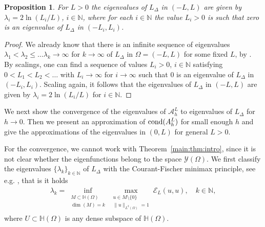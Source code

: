 \documentclass[10 pt]{article}
\newtheorem{proposition}[theorem]{Proposition}
\numberwithin{equation}{section}
\def\N{\mathbb{N}}
\def\mH{\mathbb{H}}
\begin{document}
\begin{proposition}\label{eigenvalue approximation a}
For $L>0$ the eigenvalues of $L_{\Delta}$ in $(-L,L)$ are given by $\lambda_i=2\ln(L_i/L)$, $i\in \N$, where for each $i\in \N$ the value $L_i>0$ is such that zero is an eigenvalue of $L_{\Delta}$ in $(-L_i,L_i)$.
\end{proposition}
\begin{proof}
We already know that there is an infinite sequence of eigenvalues $\lambda_1<\lambda_2\leq\ldots\lambda_k\to \infty$ for $k\to\infty$ of $L_{\Delta}$ in $\Omega=(-L,L)$ for some fixed $L$, by \cite[Theorem 1.4]{CW19}. By scalings, one can find a sequence of values $L_i>0$, $i\in \N$ satisfying $0<L_1<L_2<\ldots$ with $L_i\to\infty$ for $i\to \infty$ such that $0$ is an eigenvalue of $L_{\Delta}$ in $(-L_i,L_i)$. Scaling again, it follows that the eigenvalues of $L_{\Delta}$ in $(-L,L)$ are given by $\lambda_i=2\ln(L_i/L)$ for $i\in \N$.
%
\end{proof}

We next show the convergence of the eigenvalues of $\mathcal{A}^L_h$ to eigenvalues of $L_{\Delta}$ for $h\to 0$. Then we present an approximation of $\textnormal{cond}(A^L_h)$ for small enough $h$ and give the approximations of the eigenvalues in $(0,L)$ for general $L>0$.

For the convergence, we cannot work with Theorem~\ref{main:thm:intro}, since it is not clear whether the eigenfunctions belong to the space $\mathcal{Y} (\Omega)$. We first classify the eigenvalues $\{\lambda_k\}_{k\in \N}$ of $L_{\Delta}$ with the Courant-Fischer minimax principle, see e.g. \cite[Proposition 2.3 and Remark 2.4]{FJW22}, that is it holds
\begin{align}\label{CF}
\lambda_k=\inf_{\substack{M\subset \mH(\Omega)\\ \dim(M)=k}} \max_{\substack{u\in M\setminus\{0\}\\ \|u\|_{L^2(\Omega)}=1}} \mathcal{E}_L(u,u),\quad k\in \N, 
\end{align}
where $U\subset\mH(\Omega)$ is any dense subspace of $\mH(\Omega)$.
\end{document}
